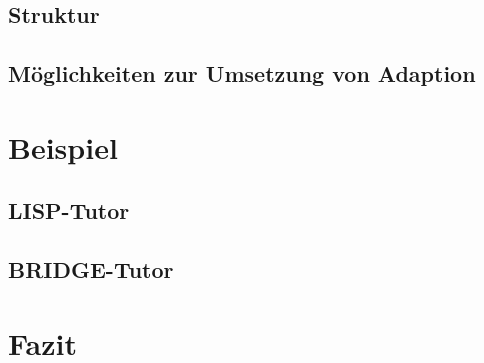 \documentclass{beamer}
\begin{document}
\subsection{Struktur}
\subsection{Möglichkeiten zur Umsetzung von Adaption}


\section{Beispiel}
\subsection{LISP-Tutor}
\subsection{BRIDGE-Tutor}

\section{Fazit}
\end{document}
